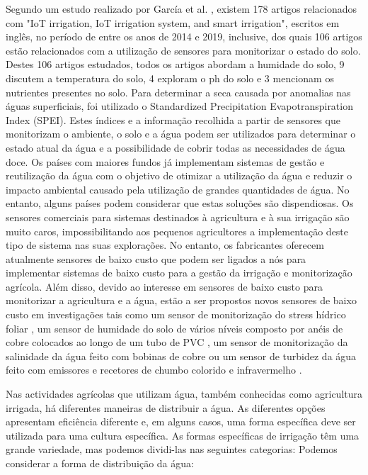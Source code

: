\documentclass[conference]{IEEEtran}
\begin{document}
Segundo um estudo realizado por García et al. \cite{garcia2020iot}, existem 178 artigos 
relacionados com  "IoT irrigation, IoT irrigation system, and smart 
irrigation", escritos em inglês, no período de entre os 
anos de 2014 e 2019, inclusive, dos quais 106 artigos estão relacionados com a 
utilização de sensores para monitorizar o estado do solo. Destes 106 artigos 
estudados, todos os artigos abordam a humidade do solo, 9 discutem a temperatura 
do solo, 4 exploram o ph do solo e 3 mencionam os nutrientes presentes no solo. 
Para determinar a seca causada por anomalias nas águas superficiais, 
foi utilizado o Standardized Precipitation Evapotranspiration Index (SPEI). 
Estes índices e a informação recolhida a partir de sensores que monitorizam o ambiente, 
o solo e a água podem ser utilizados para determinar o estado atual da água e a 
possibilidade de cobrir todas as necessidades de água doce. Os países com maiores 
fundos já implementam sistemas de gestão e reutilização da água com o objetivo de 
otimizar a utilização da água e reduzir o impacto ambiental causado pela utilização 
de grandes quantidades de água. No entanto, alguns países podem considerar que estas 
soluções são dispendiosas. 
Os sensores comerciais para sistemas destinados à agricultura e à sua irrigação 
são muito caros, impossibilitando aos pequenos agricultores a implementação deste 
tipo de sistema nas suas explorações. No entanto, os fabricantes oferecem atualmente 
sensores de baixo custo que podem ser ligados a nós para implementar sistemas de baixo 
custo para a gestão da irrigação e monitorização agrícola. Além disso, devido ao interesse 
em sensores de baixo custo para monitorizar a agricultura e a água, estão a ser propostos 
novos sensores de baixo custo em investigações tais como um sensor de monitorização do 
stress hídrico foliar \cite{daskalakis2018}, um sensor de humidade do solo de vários níveis composto 
por anéis de cobre colocados ao longo de um tubo de PVC \cite{guruprasadh2017intelligent}, 
um sensor de monitorização da salinidade da água feito com bobinas de 
cobre \cite{parra2013low} ou um sensor de turbidez da água 
feito com emissores e recetores de chumbo colorido e infravermelho \cite{sendra2013low}.

Nas actividades agrícolas que utilizam água, também conhecidas 
como agricultura irrigada, há diferentes maneiras de distribuir a água. 
As diferentes opções apresentam eficiência diferente e, em alguns casos, 
uma forma específica deve ser utilizada para uma cultura específica. 
As formas específicas de irrigação têm uma grande variedade, mas podemos 
dividi-las nas seguintes categorias: Podemos considerar a forma de 
distribuição da água: 
\end{document}

